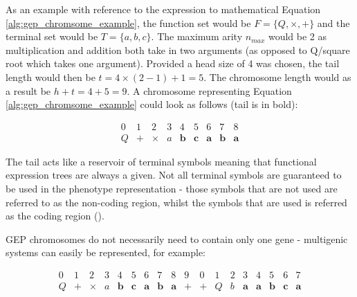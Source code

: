 \parbreak\noindent As an example with reference to the expression to mathematical Equation \ref{alg:gep_chromsome_example}, the function set would be $F=\{Q,\times,+\}$ and the terminal set would be $T=\{a,b,c\}$. The maximum arity $n_{max}$ would be 2 as multiplication and addition both take in two arguments (as opposed to Q/square root which takes one argument). Provided a head size of 4 was chosen, the tail length would then be $t = 4 \times (2 - 1) + 1 = 5$. The chromosome length would as a result be $h + t = 4 + 5 = 9$. A chromosome representing Equation \ref{alg:gep_chromsome_example} could look as follows (tail is in bold):
\begin{ceqn}
    \begin{equation}\label{alg:gep_full_chromosome}
        \begin{array}{ccccccccc}
            0 & 1 & 2 & 3 & 4 & 5 & 6 & 7 & 8\\
            Q & + & \times & a & \textbf{b} & \textbf{c} & \textbf{a} & \textbf{b} & \textbf{a}
        \end{array}
    \end{equation}
\end{ceqn}

\parbreak\noindent The tail acts like a reservoir of terminal symbols meaning that functional expression trees are always a given. Not all terminal symbols are guaranteed to be used in the phenotype representation - those symbols that are not used are referred to as the non-coding region, whilst the symbols that are used is referred as the coding region (\cite{ferreira2006gene}).

\parbreak\noindent GEP chromosomes do not necessarily need to contain only one gene - multigenic systems can easily be represented, for example:
\begin{ceqn}
    \begin{equation}\label{alg:gep_full_chromosome}
        \begin{array}{cccccccccccccccccc}
            0 & 1 & 2 & 3 & 4 & 5 & 6 & 7 & 8 & 9 & 0 & 1 & 2 & 3 & 4 & 5 & 6 & 7 \\
            Q & + & \times & a & \textbf{b} & \textbf{c} & \textbf{a} & \textbf{b} & \textbf{a} & + & + & Q & b & \textbf{a} & \textbf{a} & \textbf{b} & \textbf{c} & \textbf{a}
        \end{array}
    \end{equation}
\end{ceqn}


